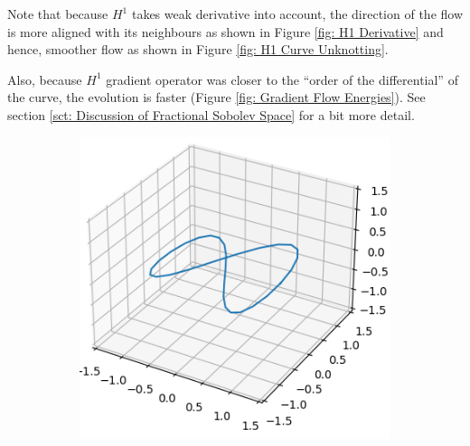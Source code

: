 \documentclass[../dissertation.tex]{subfiles}
\begin{document}
Note that because $H^1$ takes weak derivative into account, the direction of the flow is more aligned with its neighbours as shown in Figure \ref{fig: H1 Derivative} and hence, smoother flow as shown in Figure \ref{fig: H1 Curve Unknotting}.

Also, because $H^1$ gradient operator was closer to the ``order of the differential'' of the curve,
the evolution is faster (Figure \ref{fig: Gradient Flow Energies}).
See section \ref{sct: Discussion of Fractional Sobolev Space} for a bit more detail.

\begin{figure}[tbp]
    \centering
    \begin{subfigure}[b]{0.32\textwidth}
        \centering
        \includegraphics[width=\textwidth]{sections/unknottingCurveImgs/figure8-H1-0}
    \end{subfigure}
    \begin{subfigure}[b]{0.32\textwidth}
        \centering

\end{subfigure}
\end{figure}
\end{document}
